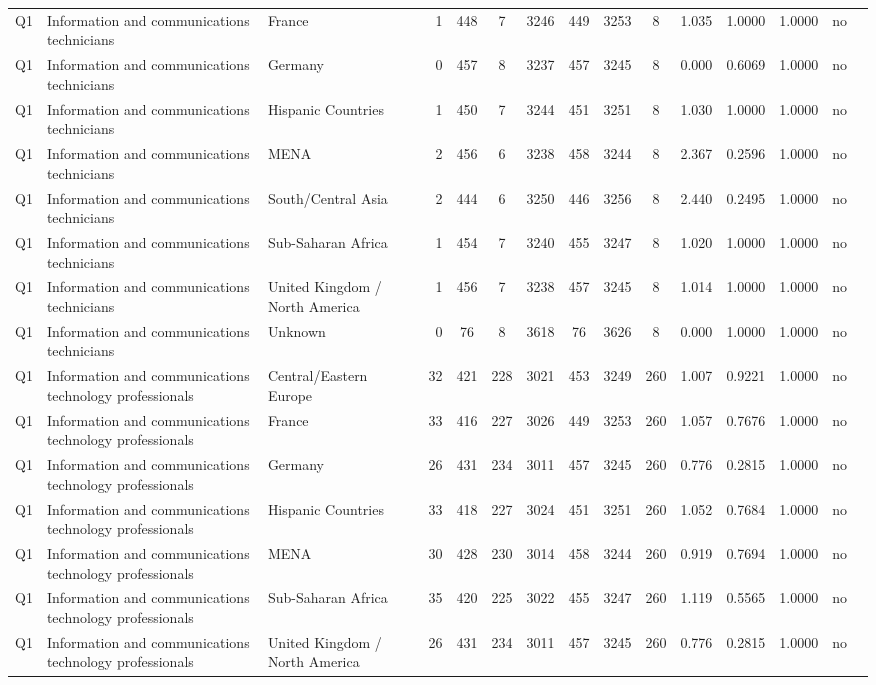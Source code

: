 \begin{longtable}{lllrcccccccccll}
Q1 & Information and communications technicians & France & 1 & 448 & 7 & 3246 & 449 & 3253 & 8 & 1.035 & 1.0000 & 1.0000 & no \\
Q1 & Information and communications technicians & Germany & 0 & 457 & 8 & 3237 & 457 & 3245 & 8 & 0.000 & 0.6069 & 1.0000 & no \\
Q1 & Information and communications technicians & Hispanic Countries & 1 & 450 & 7 & 3244 & 451 & 3251 & 8 & 1.030 & 1.0000 & 1.0000 & no \\
Q1 & Information and communications technicians & MENA & 2 & 456 & 6 & 3238 & 458 & 3244 & 8 & 2.367 & 0.2596 & 1.0000 & no \\
Q1 & Information and communications technicians & South/Central Asia & 2 & 444 & 6 & 3250 & 446 & 3256 & 8 & 2.440 & 0.2495 & 1.0000 & no \\
Q1 & Information and communications technicians & Sub-Saharan Africa & 1 & 454 & 7 & 3240 & 455 & 3247 & 8 & 1.020 & 1.0000 & 1.0000 & no \\
Q1 & Information and communications technicians & United Kingdom / North America & 1 & 456 & 7 & 3238 & 457 & 3245 & 8 & 1.014 & 1.0000 & 1.0000 & no \\
Q1 & Information and communications technicians & Unknown & 0 & 76 & 8 & 3618 & 76 & 3626 & 8 & 0.000 & 1.0000 & 1.0000 & no \\
Q1 & Information and communications technology professionals & Central/Eastern Europe & 32 & 421 & 228 & 3021 & 453 & 3249 & 260 & 1.007 & 0.9221 & 1.0000 & no \\
Q1 & Information and communications technology professionals & France & 33 & 416 & 227 & 3026 & 449 & 3253 & 260 & 1.057 & 0.7676 & 1.0000 & no \\
Q1 & Information and communications technology professionals & Germany & 26 & 431 & 234 & 3011 & 457 & 3245 & 260 & 0.776 & 0.2815 & 1.0000 & no \\
Q1 & Information and communications technology professionals & Hispanic Countries & 33 & 418 & 227 & 3024 & 451 & 3251 & 260 & 1.052 & 0.7684 & 1.0000 & no \\
Q1 & Information and communications technology professionals & MENA & 30 & 428 & 230 & 3014 & 458 & 3244 & 260 & 0.919 & 0.7694 & 1.0000 & no \\
Q1 & Information and communications technology professionals & Sub-Saharan Africa & 35 & 420 & 225 & 3022 & 455 & 3247 & 260 & 1.119 & 0.5565 & 1.0000 & no \\
Q1 & Information and communications technology professionals & United Kingdom / North America & 26 & 431 & 234 & 3011 & 457 & 3245 & 260 & 0.776 & 0.2815 & 1.0000 & no \\

\end{longtable}
